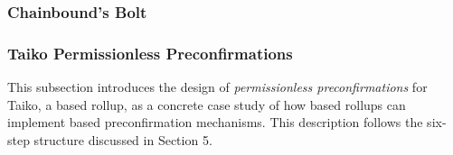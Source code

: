 \documentclass[a4paper]{article}
\theoremstyle{boldstyle}
\begin{document}
    

        \subsubsection{ \textbf{Chainbound's Bolt}}
        
        \subsubsection{ \textbf{Taiko Permissionless Preconfirmations}}

        This subsection introduces the design of \emph{permissionless preconfirmations} for Taiko, a based rollup, as a concrete case study of how based rollups can implement based preconfirmation mechanisms. This description follows the six-step structure discussed in Section 5.
        
\end{document}
